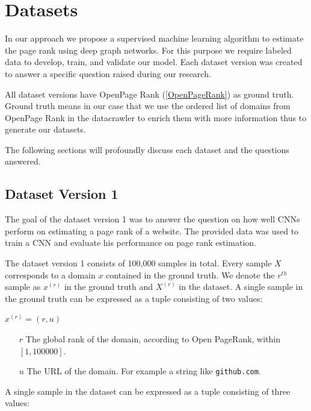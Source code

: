 
\section{Datasets}

In our approach we propose a supervised machine learning algorithm to estimate the page rank using deep graph networks. For this purpose we require labeled data to develop, train, and validate our model. Each dataset version was created to answer a specific question raised during our research.

All dataset versions have OpenPage Rank (\ref{OpenPageRank}) as ground truth. Ground truth means in our case that we use the ordered list of domains from OpenPage Rank in the datacrawler to enrich them with more information thus to generate our datasets.

The following sections will profoundly discuss each dataset and the questions answered. 

\subsection{Dataset Version 1}
\label{DatasetVersion1}
The goal of the dataset version 1 was to answer the question on how well CNNs perform on estimating a page rank of a website. The provided data was used to train a CNN and evaluate his performance on page rank estimation.

The dataset version 1 consists of 100,000 samples in total. Every sample $X$ corresponds to a domain $x$ contained in the ground truth. We denote the $r^{th}$ sample as $x^{(r)}$ in the ground truth and $X^{(r)}$ in the dataset. 
A single sample in the ground truth can be expressed as a tuple consisting of two values:

\begin{center}
	$x^{(r)} = (r, u)$
	\begin{itemize}
		\item[$r$] The global rank of the domain, according to Open PageRank, within $[1, 100000]$. 
		\item[$u$] The URL of the domain. For example a string like \texttt{github.com}.
	\end{itemize}
\end{center}

A single sample in the dataset can be expressed as a tuple consisting of three values:

